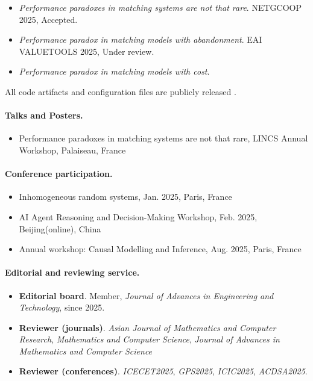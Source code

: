 \documentclass[11pt]{article}
\begin{document}
\begin{itemize}\itemsep0.25em
\item \emph{Performance paradoxes in matching systems are not that rare}. NETGCOOP 2025, Accepted.
\item \emph{Performance paradox in matching models with abandonment}. EAI VALUETOOLS 2025, Under review.
\item \emph{Performance paradox in matching models with cost}.
\end{itemize}
All code artifacts and configuration files are publicly released \cite{li2025,li2025a,li2025b}.

\paragraph{Talks and Posters.}
\begin{itemize}
\item Performance paradoxes in matching systems are not that rare, LINCS Annual Workshop, Palaiseau, France
\end{itemize}

\paragraph{Conference participation.}
\begin{itemize}\itemsep0.05em
\item Inhomogeneous random systems, Jan. 2025, Paris, France
\item AI Agent Reasoning and Decision-Making Workshop, Feb. 2025, Beijing(online), China
\item Annual workshop: Causal Modelling and Inference, Aug. 2025, Paris, France
\end{itemize}

\paragraph{Editorial and reviewing service.}
\begin{itemize}\itemsep0.25em
\item \textbf{Editorial board}. Member, \emph{Journal of Advances in Engineering and Technology}, since 2025.
\item \textbf{Reviewer (journals)}. \emph{Asian Journal of Mathematics and Computer Research}, \emph{Mathematics and Computer Science}, \emph{Journal of Advances in Mathematics and Computer Science}
\item \textbf{Reviewer (conferences)}. \emph{ICECET2025}, \emph{GPS2025}, \emph{ICIC2025}, \emph{ACDSA2025}.
\end{itemize}
\end{document}
